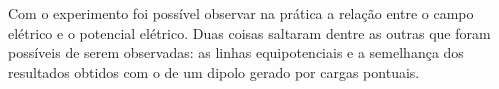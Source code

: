 \documentclass[
12pt,				%
oneside,			%
a4paper,			%
english,			%
french,				%
spanish,			%
brazil				%
]{abntex2}
\begin{document}
Com o experimento foi possível observar na prática a relação entre o campo elétrico e o potencial elétrico.
Duas coisas saltaram dentre as outras que foram possíveis de serem observadas: as linhas equipotenciais e a semelhança dos resultados obtidos com o de um dipolo gerado por cargas pontuais.
\iffalse
	
\begin{figure}[H]
	\begin{center}
		\texttt{[image: \{fluxograma]}.pdf}
		\caption{Fluxograma de aquisição de dados}
		\label{fluxograma}
	\end{center}
\end{figure}
\fi




\postextual


%
%
\end{document}

